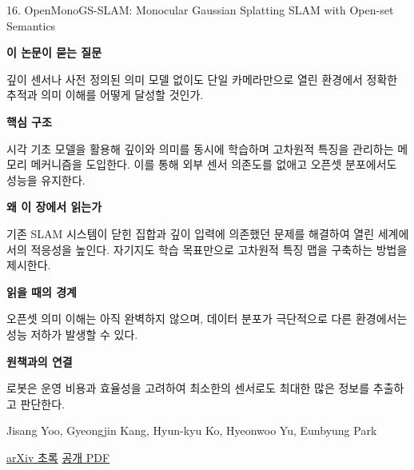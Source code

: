 \documentclass[11pt,openany]{book}
\begin{document}
\begin{termcard}{16. OpenMonoGS-SLAM: Monocular Gaussian Splatting SLAM with Open-set Semantics}

\par

\medskip

{\sffamily\bfseries\color{deepblue} 이 논문이 묻는 질문}\par

깊이 센서나 사전 정의된 의미 모델 없이도 단일 카메라만으로 열린 환경에서 정확한 추적과 의미 이해를 어떻게 달성할 것인가.

\smallskip

{\sffamily\bfseries\color{deepblue} 핵심 구조}\par

시각 기초 모델을 활용해 깊이와 의미를 동시에 학습하며 고차원적 특징을 관리하는 메모리 메커니즘을 도입한다. 이를 통해 외부 센서 의존도를 없애고 오픈셋 분포에서도 성능을 유지한다.

\smallskip

{\sffamily\bfseries\color{deepblue} 왜 이 장에서 읽는가}\par

기존 SLAM 시스템이 닫힌 집합과 깊이 입력에 의존했던 문제를 해결하여 열린 세계에서의 적응성을 높인다. 자기지도 학습 목표만으로 고차원적 특징 맵을 구축하는 방법을 제시한다.

\smallskip

{\sffamily\bfseries\color{coral} 읽을 때의 경계}\par

오픈셋 의미 이해는 아직 완벽하지 않으며, 데이터 분포가 극단적으로 다른 환경에서는 성능 저하가 발생할 수 있다.

\smallskip

{\sffamily\bfseries\color{teal} 원책과의 연결}\par

로봇은 운영 비용과 효율성을 고려하여 최소한의 센서로도 최대한 많은 정보를 추출하고 판단한다.

\medskip

{\footnotesize\color{muted} Jisang Yoo, Gyeongjin Kang, Hyun-kyu Ko, Hyeonwoo Yu, Eunbyung Park\par

\href{https://arxiv.org/abs/2512.08625}{arXiv 초록} \quad \href{https://arxiv.org/pdf/2512.08625}{공개 PDF}\par}

\end{termcard}
\end{document}
